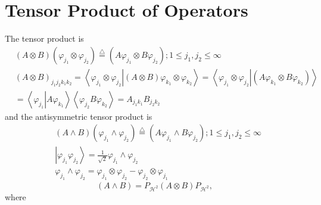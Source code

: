\documentclass[aps,preprint]{revtex4}%
\begin{document}
\section{Tensor Product of Operators}

The tensor product is
\begin{align}
&  \left(  A\otimes B\right)  \left(  \varphi_{j_{1}}\otimes\varphi_{j_{2}%
}\right)  \overset{\bigtriangleup}{=}\left(  A\varphi_{j_{1}}\otimes
B\varphi_{j_{2}}\right)  ;1\leq j_{1},j_{2}\leq\infty\nonumber\\
&  \left(  A\otimes B\right)  _{j_{1}j_{2}k_{1}k_{2}}=\left\langle
\varphi_{j_{1}}\otimes\varphi_{j_{2}}\left\vert \left(  A\otimes B\right)
\varphi_{k_{1}}\otimes\varphi_{k_{2}}\right.  \right\rangle =\left\langle
\varphi_{j_{1}}\otimes\varphi_{j_{2}}\left\vert \left(  A\varphi_{k_{1}%
}\otimes B\varphi_{k_{2}}\right)  \right.  \right\rangle \nonumber\\
&  =\left\langle \varphi_{j_{1}}\left\vert A\varphi_{k_{1}}\right.
\right\rangle \left\langle \varphi_{j_{2}}B\varphi_{k_{2}}\right\rangle
=A_{j_{1}k_{1}}B_{j_{2}k_{2}}%
\end{align}
and the antisymmetric tensor product is
\begin{align}
&  \left(  A\wedge B\right)  \left(  \varphi_{j_{1}}\wedge\varphi_{j_{2}%
}\right)  \overset{\bigtriangleup}{=}\left(  A\varphi_{j_{1}}\wedge
B\varphi_{j_{2}}\right)  ;1\leq j_{1},j_{2}\leq\infty\nonumber\\
&  \left\vert \varphi_{j_{1}}\varphi_{j_{2}}\right\rangle =\frac{1}{\sqrt{2}%
}\varphi_{j_{1}}\wedge\varphi_{j_{2}}\nonumber\\
&  \varphi_{j_{1}}\wedge\varphi_{j_{2}}=\varphi_{j_{1}}\otimes\varphi_{j_{2}%
}-\varphi_{j_{2}}\otimes\varphi_{j_{1}}%
\end{align}%
\begin{equation}
\left(  A\wedge B\right)  =P_{\mathcal{H}^{2}}\left(  A\otimes B\right)
P_{\mathcal{H}^{2}},
\end{equation}
where%
\end{document}
